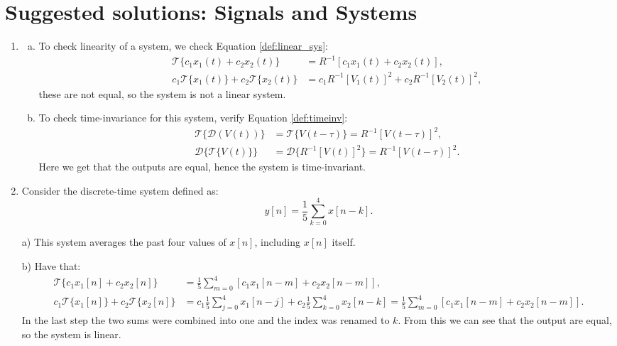 \newpage
\section{Suggested solutions: Signals and Systems}
\begin{enumerate}
\item

\begin{enumerate}[a)]
\item To check linearity of a system, we check Equation \ref{def:linear_sys}:
\begin{align*}
    \mathcal{T}\{c_{1}x_{1}(t)+c_{2}x_{2}(t)\}&=R^{-1}[c_{1}x_{1}(t)+c_{2}x_{2}(t)], \\
    c_{1}\mathcal{T}\{x_{1}(t)\}+c_{2}\mathcal{T}\{x_{2}(t)\} &=c_{1}R^{-1}[V_{1}(t)]^{2} + c_{2}R^{-1}[V_{2}(t)]^{2},
\end{align*}
these are not equal, so the system is not a linear system. 

\item To check time-invariance for this system, verify Equation \ref{def:timeinv}:
\begin{align*}
    \mathcal{T}\{\mathcal{D}(V(t))\}&=\mathcal{T}\{V(t-\tau)\}=R^{-1}[V(t-\tau)]^{2}, \\
    \mathcal{D}\{\mathcal{T}\{V(t)\}\}&=\mathcal{D}\{R^{-1}[V(t)]^{2}\}=R^{-1}[V(t-\tau)]^{2}.
\end{align*}
Here we get that the outputs are equal, hence the system is time-invariant. 
\end{enumerate}

\item
Consider the discrete-time system defined as:
$$y[n]=\frac{1}{5}\sum_{k=0}^{4}x[n-k].$$

\item[a)]
This system averages the past four values of $x[n]$, including $x[n]$ itself. 

\item[b)] Have that:
\begin{align*}
    \mathcal{T}\{c_{1}x_{1}[n]+c_{2}x_{2}[n]\} &= \frac{1}{5}\sum_{m=0}^{4}[c_{1}x_{1}[n-m]+c_{2}x_{2}[n-m]], \\
    c_{1}\mathcal{T}\{x_{1}[n]\}+c_{2}\mathcal{T}\{x_{2}[n]\}&=c_{1}\frac{1}{5}\sum_{j=0}^{4}x_{1}[n-j]+c_{2}\frac{1}{5}\sum_{k=0}^{4}x_{2}[n-k]
    =\frac{1}{5}\sum_{m=0}^{4}[c_{1}x_{1}[n-m]+c_{2}x_{2}[n-m]].
\end{align*}
In the last step the two sums were combined into one and the index was renamed to $k$. 
From this we can see that the output are equal, so the system is linear. 


\end{enumerate}
